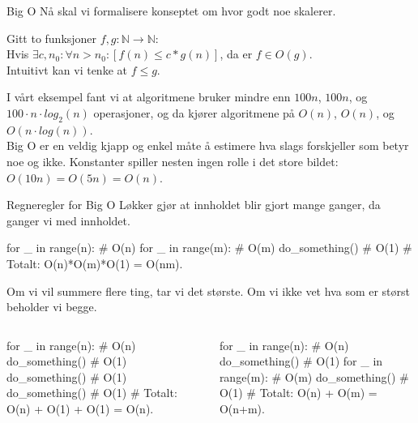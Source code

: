 \begin{frame}{Big O}
    Nå skal vi formalisere konseptet om hvor godt noe skalerer.
    \begin{definition}[Big O]
        Gitt to funksjoner $f, g : \mathbb{N} \rightarrow \mathbb{N}$: \\
        Hvis $\exists c, n_0 : \forall n > n_0 : [ f(n) \leq c*g(n) ]$, da er $f \in O(g)$.\\
        Intuitivt kan vi tenke at $f \leq g$.
    \end{definition}
    \pause
    I vårt eksempel fant vi at algoritmene bruker mindre enn $100n$, $100n$, og $100 \cdot n \cdot log_2(n)$ operasjoner, og da kjører algoritmene på $O(n)$, $O(n)$, og $O(n \cdot log(n))$.\\[2mm]
    Big O er en veldig kjapp og enkel måte å estimere hva slags forskjeller som betyr noe og ikke. Konstanter spiller nesten ingen rolle i det store bildet: $O(10n) = O(5n) = O(n)$.
\end{frame}

\begin{frame}[fragile]{Regneregler for Big O}
    Løkker gjør at innholdet blir gjort mange ganger, da ganger vi med innholdet.
    \begin{python}
for _ in range(n):     # O(n)
    for _ in range(m): # O(m)
        do_something() # O(1)
# Totalt: O(n)*O(m)*O(1) = O(nm).
    \end{python}
    \pause
    Om vi vil summere flere ting, tar vi det største. Om vi ikke vet hva som er størst beholder vi begge.  
    \begin{columns}
        \begin{column}{0.51\textwidth}
            \begin{python}
for _ in range(n): # O(n)
    do_something() # O(1)
do_something()     # O(1)
do_something()     # O(1)
# Totalt: O(n) + O(1) + O(1) = O(n).  
            \end{python}
        \end{column}
        \pause
        \begin{column}{0.45\textwidth}
            \begin{python}
for _ in range(n): # O(n)
    do_something() # O(1)
for _ in range(m): # O(m)
    do_something() # O(1)
# Totalt: O(n) + O(m) = O(n+m).
            \end{python}
        \end{column}
    \end{columns}
\end{frame}